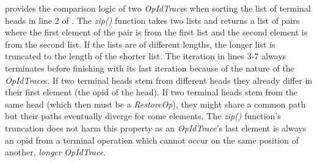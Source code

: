 \documentclass[sigplan,natbib=false,review]{acmart}
\newcommand{\restopkind}{\textit{RestoreOp}}
\newcommand{\opidtrace}{\textit{OpIdTrace}}
\begin{document}
 provides the comparison logic of two \opidtrace{}s
when sorting the list of terminal heads in line 2 of .
The \textit{zip()} function takes two lists and returns a list of pairs
where the first element of the pair is from the first list and the second
element is from the second list.
If the lists are of different lengths, the longer list is truncated to the
length of the shorter list.
The iteration in lines 3-7 always terminates before finishing with
its last iteration because of the nature of the \opidtrace{}s.
If two terminal heads stem from different heads they already differ in their
first element (the \gls*{opid} of the head).
If two terminal heads stem from the same head (which then must be a \restopkind{}),
they might share a common path but their paths eventually diverge for some elements.
The \textit{zip()} function's truncation does not harm this property
as an \opidtrace{}'s last element is always an \gls*{opid} from a terminal operation
which cannot occur on the same position of another, \emph{longer} \opidtrace{}.
\end{document}
